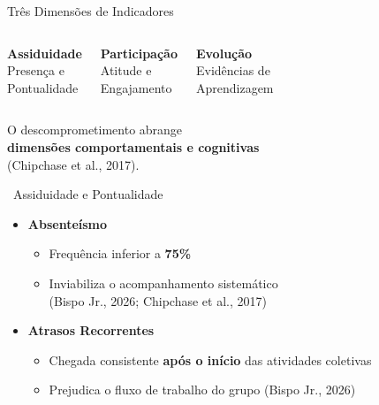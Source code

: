 \documentclass[xcolor=dvipsnames,table]{beamer}
\begin{document}
  \begin{frame}{Três Dimensões de Indicadores}
    \begin{columns}
      \begin{block}{\centering \textcolor{white}{\faClock}}
        \centering \textbf{Assiduidade} \\[4pt]
        \small Presença e\\Pontualidade
      \end{block}
      \begin{block}{\centering \textcolor{white}{\faHandshake}}
        \centering \textbf{Participação} \\[4pt]
        \small Atitude e\\Engajamento
      \end{block}
      \begin{block}{\centering \textcolor{white}{\faChartLine}}
        \centering \textbf{Evolução} \\[4pt]
        \small Evidências de\\Aprendizagem
      \end{block}
    \end{columns}
    \vspace{0.8em}
    \pause
    \begin{center}
      \small O descomprometimento abrange \\\textbf{dimensões comportamentais e cognitivas}\\
      (Chipchase et al., 2017).
    \end{center}
  \end{frame}

  \begin{frame}{\textcolor{white}{\faClock}\ Assiduidade e Pontualidade}
    \begin{itemize}
      \item[\textcolor{BrickRed}{\faBan}] \textbf{Absenteísmo}
        \begin{itemize}
          \item Frequência inferior a \textbf{75\%}
          \item Inviabiliza o acompanhamento sistemático\\
            {\small (Bispo Jr., 2026; Chipchase et al., 2017)}
        \end{itemize}
      \pause
      \bigskip
      \item[\textcolor{Goldenrod}{\faClock}] \textbf{Atrasos Recorrentes}
        \begin{itemize}
          \item Chegada consistente \textbf{após o início} das atividades coletivas
          \item Prejudica o fluxo de trabalho do grupo {\small (Bispo Jr., 2026)}
        \end{itemize}
    \end{itemize}
  \end{frame}
\end{document}
